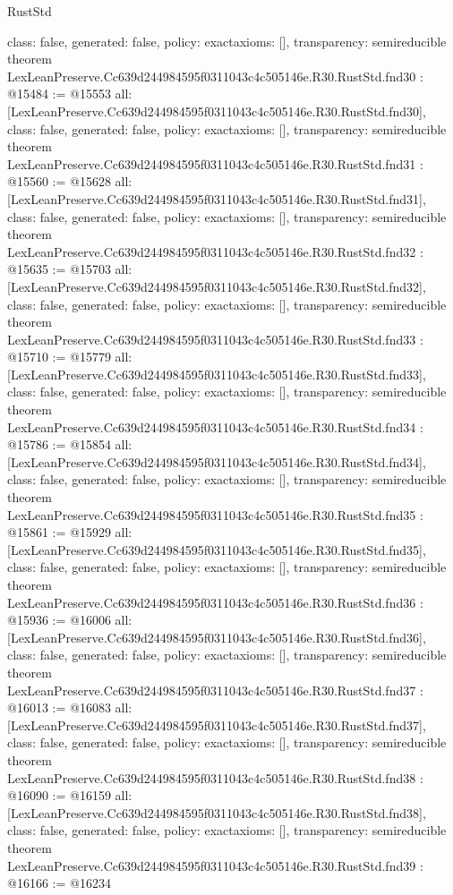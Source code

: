 \begin{lexlean}{RustStd}
\begin{coremodule}
{  class: false,
  generated: false,
  policy: exact{axioms: []},
  transparency: semireducible
}
theorem LexLeanPreserve.Cc639d244984595f0311043c4c505146e.R30.RustStd.fnd30 : @15484 := @15553 {
  all: [LexLeanPreserve.Cc639d244984595f0311043c4c505146e.R30.RustStd.fnd30],
  class: false,
  generated: false,
  policy: exact{axioms: []},
  transparency: semireducible
}
theorem LexLeanPreserve.Cc639d244984595f0311043c4c505146e.R30.RustStd.fnd31 : @15560 := @15628 {
  all: [LexLeanPreserve.Cc639d244984595f0311043c4c505146e.R30.RustStd.fnd31],
  class: false,
  generated: false,
  policy: exact{axioms: []},
  transparency: semireducible
}
theorem LexLeanPreserve.Cc639d244984595f0311043c4c505146e.R30.RustStd.fnd32 : @15635 := @15703 {
  all: [LexLeanPreserve.Cc639d244984595f0311043c4c505146e.R30.RustStd.fnd32],
  class: false,
  generated: false,
  policy: exact{axioms: []},
  transparency: semireducible
}
theorem LexLeanPreserve.Cc639d244984595f0311043c4c505146e.R30.RustStd.fnd33 : @15710 := @15779 {
  all: [LexLeanPreserve.Cc639d244984595f0311043c4c505146e.R30.RustStd.fnd33],
  class: false,
  generated: false,
  policy: exact{axioms: []},
  transparency: semireducible
}
theorem LexLeanPreserve.Cc639d244984595f0311043c4c505146e.R30.RustStd.fnd34 : @15786 := @15854 {
  all: [LexLeanPreserve.Cc639d244984595f0311043c4c505146e.R30.RustStd.fnd34],
  class: false,
  generated: false,
  policy: exact{axioms: []},
  transparency: semireducible
}
theorem LexLeanPreserve.Cc639d244984595f0311043c4c505146e.R30.RustStd.fnd35 : @15861 := @15929 {
  all: [LexLeanPreserve.Cc639d244984595f0311043c4c505146e.R30.RustStd.fnd35],
  class: false,
  generated: false,
  policy: exact{axioms: []},
  transparency: semireducible
}
theorem LexLeanPreserve.Cc639d244984595f0311043c4c505146e.R30.RustStd.fnd36 : @15936 := @16006 {
  all: [LexLeanPreserve.Cc639d244984595f0311043c4c505146e.R30.RustStd.fnd36],
  class: false,
  generated: false,
  policy: exact{axioms: []},
  transparency: semireducible
}
theorem LexLeanPreserve.Cc639d244984595f0311043c4c505146e.R30.RustStd.fnd37 : @16013 := @16083 {
  all: [LexLeanPreserve.Cc639d244984595f0311043c4c505146e.R30.RustStd.fnd37],
  class: false,
  generated: false,
  policy: exact{axioms: []},
  transparency: semireducible
}
theorem LexLeanPreserve.Cc639d244984595f0311043c4c505146e.R30.RustStd.fnd38 : @16090 := @16159 {
  all: [LexLeanPreserve.Cc639d244984595f0311043c4c505146e.R30.RustStd.fnd38],
  class: false,
  generated: false,
  policy: exact{axioms: []},
  transparency: semireducible
}
theorem LexLeanPreserve.Cc639d244984595f0311043c4c505146e.R30.RustStd.fnd39 : @16166 := @16234 {
}
\end{coremodule}
\end{lexlean}
